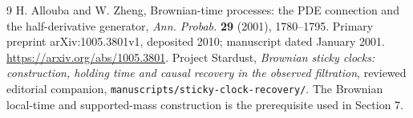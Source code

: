 \documentclass[11pt]{article}
\newcommand{\code}[1]{{\small\nolinkurl{#1}}}
\begin{document}
\begin{thebibliography}{9}
 H. Allouba and W. Zheng,
Brownian-time processes: the PDE connection and the half-derivative
generator, \emph{Ann. Probab.} \textbf{29} (2001), 1780--1795.
Primary preprint arXiv:1005.3801v1, deposited 2010;
manuscript dated January 2001.
\url{https://arxiv.org/abs/1005.3801}.
 Project Stardust,
\emph{Brownian sticky clocks: construction, holding time and causal
recovery in the observed filtration}, reviewed editorial companion,
\code{manuscripts/sticky-clock-recovery/}. The Brownian local-time
and supported-mass construction is the prerequisite used in Section 7.
\end{thebibliography}
\end{document}
